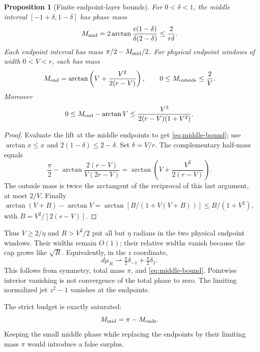 \documentclass[11pt]{article}
\newtheorem{proposition}[theorem]{Proposition}
\theoremstyle{definition}
\begin{document}
\begin{proposition}[Finite endpoint-layer bounds]\label{prop:layers}
For \(0<\delta<1\), the middle interval
\([-1+\delta,1-\delta]\) has phase mass
\begin{equation}
 M_{\rm mid}
 =2\arctan\frac{\epsilon(1-\delta)}{\delta(2-\delta)}
 \le\frac{2}{r\delta}.                            \label{eq:middle-bound}
\end{equation}
Each endpoint interval has mass \(\pi/2-M_{\rm mid}/2\).
For physical endpoint windows of width \(0<V<r\), each has mass
\begin{equation}
 M_{\rm end}
 =\arctan\left(V+\frac{V^2}{2(r-V)}\right),\qquad
 0\le M_{\rm outside}\le\frac2V.                  \label{eq:physical-window}
\end{equation}
Moreover
\[
 0\le M_{\rm end}-\arctan V
 \le\frac{V^2}{2(r-V)(1+V^2)}.
\]
\end{proposition}
\begin{proof}
Evaluate the lift at the middle endpoints to get
\eqref{eq:middle-bound}; use \(\arctan x\le x\) and
\(2(1-\delta)\le2-\delta\).
Set \(\delta=V/r\). The complementary half-mass equals
\[
 \frac\pi2-\arctan\frac{2(r-V)}{V(2r-V)}
 =\arctan\left(V+\frac{V^2}{2(r-V)}\right).
\]
The outside mass is twice the arctangent of the reciprocal of this
last argument, at most \(2/V\). Finally
\(\arctan(V+B)-\arctan V
=\arctan[B/(1+V(V+B))]\le B/(1+V^2)\), with
\(B=V^2/[2(r-V)]\).
\end{proof}

Thus \(V\ge2/\eta\) and \(R>V^2/2\) put all but \(\eta\) radians
in the two physical endpoint windows. Their widths remain \(O(1)\);
their relative widths vanish because the cap grows like \(\sqrt R\).
Equivalently, in the \(z\) coordinate,
\[
 d\mu_R\rightharpoonup
       \tfrac\pi2\delta_{-1}+\tfrac\pi2\delta_1.
\]
This follows from symmetry, total mass \(\pi\), and
\eqref{eq:middle-bound}. Pointwise interior vanishing is not convergence
of the total phase to zero. The limiting normalized jet \(z^2-1\)
vanishes at the endpoints.

The strict budget is exactly saturated:
\[
                  M_{\rm mid}=\pi-M_{\rm ends}.
\]
Keeping the small middle phase while replacing the endpoints by their
limiting mass \(\pi\) would introduce a false surplus.
\end{document}
